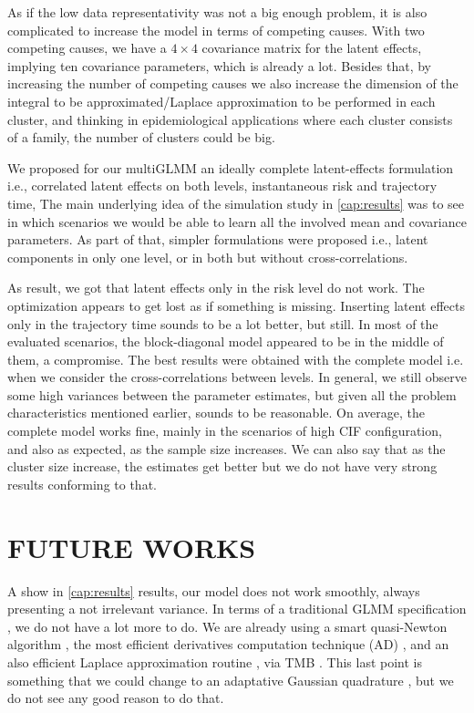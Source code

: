 As if the low data representativity was not a big enough problem, it is
also complicated to increase the model in terms of competing
causes. With two competing causes, we have a \(4\times4\) covariance
matrix for the latent effects, implying ten covariance parameters, which
is already a lot. Besides that, by increasing the number of competing
causes we also increase the dimension of the integral to be
approximated/Laplace approximation to be performed in each cluster, and
thinking in epidemiological applications where each cluster consists of
a family, the number of clusters could be big.

We proposed for our multiGLMM an ideally complete latent-effects
formulation i.e., correlated latent effects on both levels,
instantaneous risk and trajectory time, The main underlying idea of the
simulation study in \autoref{cap:results} was to see in which scenarios
we would be able to learn all the involved mean and covariance
parameters. As part of that, simpler formulations were proposed i.e.,
latent components in only one level, or in both but without
cross-correlations.

As result, we got that latent effects only in the risk level do not
work.  The optimization appears to get lost as if something is missing.
Inserting latent effects only in the trajectory time sounds to be a lot
better, but still. In most of the evaluated scenarios, the
block-diagonal model appeared to be in the middle of them, a
compromise. The best results were obtained with the complete model
i.e. when we consider the cross-correlations between levels. In general,
we still observe some high variances between the parameter estimates,
but given all the problem characteristics mentioned earlier, sounds to
be reasonable. On average, the complete model works fine, mainly in the
scenarios of high CIF configuration, and also as expected, as the sample
size increases. We can also say that as the cluster size increase, the
estimates get better but we do not have very strong results conforming
to that.

\section{FUTURE WORKS}
\label{cap:future}

A show in \autoref{cap:results} results, our model does not work
smoothly, always presenting a not irrelevant variance. In terms of a
traditional GLMM specification \cite{GLMM}, we do not have a lot more to
do. We are already using a smart quasi-Newton algorithm
\cite{PORTpaper}, the most efficient derivatives computation technique
(AD) \cite{peyre}, and an also efficient Laplace approximation routine
\cite{corestats, patrao}, via TMB \cite{TMB}. This last point is
something that we could change to an adaptative Gaussian quadrature
\cite{quadrature}, but we do not see any good reason to do that.

